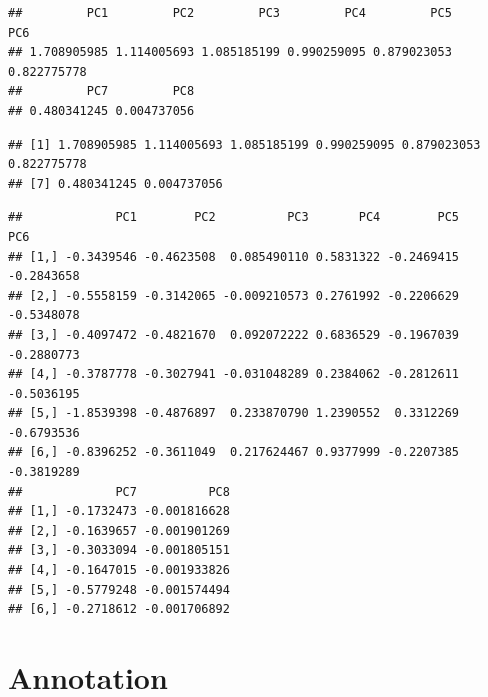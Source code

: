 \documentclass[]{article}
\newenvironment{Shaded}{\begin{snugshade}}{\end{snugshade}}
\newcommand{\KeywordTok}[1]{\textcolor[rgb]{0.13,0.29,0.53}{\textbf{#1}}}
\newcommand{\NormalTok}[1]{#1}
\newcommand{\OperatorTok}[1]{\textcolor[rgb]{0.81,0.36,0.00}{\textbf{#1}}}
\newcommand{\StringTok}[1]{\textcolor[rgb]{0.31,0.60,0.02}{#1}}
\begin{document}
\begin{verbatim}
##         PC1         PC2         PC3         PC4         PC5         PC6 
## 1.708905985 1.114005693 1.085185199 0.990259095 0.879023053 0.822775778 
##         PC7         PC8 
## 0.480341245 0.004737056
\end{verbatim}

\begin{Shaded}
\end{Shaded}

\begin{verbatim}
## [1] 1.708905985 1.114005693 1.085185199 0.990259095 0.879023053 0.822775778
## [7] 0.480341245 0.004737056
\end{verbatim}

\begin{Shaded}
\end{Shaded}

\begin{verbatim}
##             PC1        PC2          PC3       PC4        PC5        PC6
## [1,] -0.3439546 -0.4623508  0.085490110 0.5831322 -0.2469415 -0.2843658
## [2,] -0.5558159 -0.3142065 -0.009210573 0.2761992 -0.2206629 -0.5348078
## [3,] -0.4097472 -0.4821670  0.092072222 0.6836529 -0.1967039 -0.2880773
## [4,] -0.3787778 -0.3027941 -0.031048289 0.2384062 -0.2812611 -0.5036195
## [5,] -1.8539398 -0.4876897  0.233870790 1.2390552  0.3312269 -0.6793536
## [6,] -0.8396252 -0.3611049  0.217624467 0.9377999 -0.2207385 -0.3819289
##             PC7          PC8
## [1,] -0.1732473 -0.001816628
## [2,] -0.1639657 -0.001901269
## [3,] -0.3033094 -0.001805151
## [4,] -0.1647015 -0.001933826
## [5,] -0.5779248 -0.001574494
## [6,] -0.2718612 -0.001706892
\end{verbatim}

\hypertarget{annotation}{%
\section{Annotation}\label{annotation}}
\end{document}
